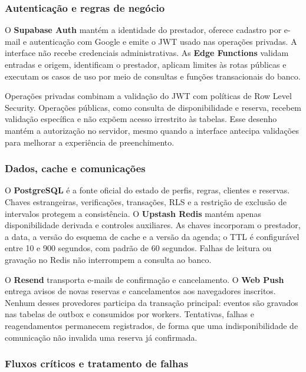 \subsubsection{Autenticação e regras de negócio}

O \textbf{Supabase Auth} mantém a identidade do prestador, oferece cadastro por e-mail e autenticação com Google e emite o JWT usado nas operações privadas. A interface não recebe credenciais administrativas. As \textbf{Edge Functions} validam entradas e origem, identificam o prestador, aplicam limites às rotas públicas e executam os casos de uso por meio de consultas e funções transacionais do banco.

Operações privadas combinam a validação do JWT com políticas de Row Level Security. Operações públicas, como consulta de disponibilidade e reserva, recebem validação específica e não expõem acesso irrestrito às tabelas. Esse desenho mantém a autorização no servidor, mesmo quando a interface antecipa validações para melhorar a experiência de preenchimento.

\subsubsection{Dados, cache e comunicações}

O \textbf{PostgreSQL} é a fonte oficial do estado de perfis, regras, clientes e reservas. Chaves estrangeiras, verificações, transações, RLS e a restrição de exclusão de intervalos protegem a consistência. O \textbf{Upstash Redis} mantém apenas disponibilidade derivada e controles auxiliares. As chaves incorporam o prestador, a data, a versão do esquema de cache e a versão da agenda; o TTL é configurável entre 10 e 900 segundos, com padrão de 60 segundos. Falhas de leitura ou gravação no Redis não interrompem a consulta ao banco.

O \textbf{Resend} transporta e-mails de confirmação e cancelamento. O \textbf{Web Push} entrega avisos de novas reservas e cancelamentos aos navegadores inscritos. Nenhum desses provedores participa da transação principal: eventos são gravados nas tabelas de outbox e consumidos por workers. Tentativas, falhas e reagendamentos permanecem registrados, de forma que uma indisponibilidade de comunicação não invalida uma reserva já confirmada.

\subsubsection{Fluxos críticos e tratamento de falhas}

